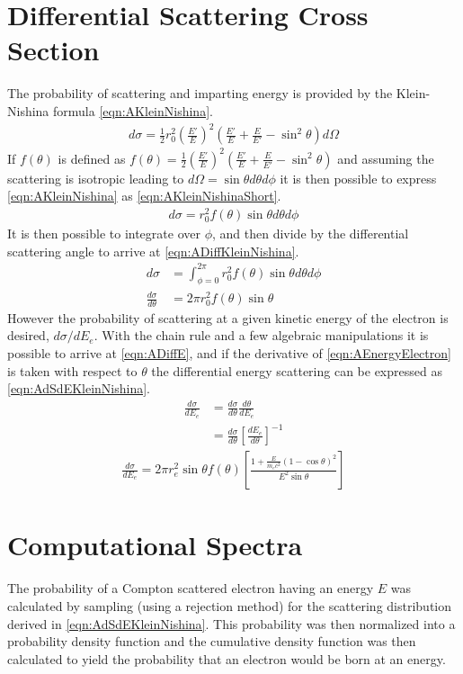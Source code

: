 \section{Differential Scattering Cross Section}
The probability of scattering and imparting energy is provided by the Klein-Nishina formula \eqref{eqn:AKleinNishina}.
\begin{align}
  \label{eqn:AKleinNishina}
  d\sigma = \frac{1}{2} r_0^2 \left(\frac{E'}{E}\right)^2 \left(\frac{E'}{E} + \frac{E}{E'}-\sin^2\theta\right)d\Omega
\end{align}
If $f(\theta)$ is defined as $f(\theta) = \frac{1}{2}\left(\frac{E'}{E}\right)^2 \left(\frac{E'}{E} + \frac{E}{E'}-\sin^2\theta\right)$ and assuming the scattering is isotropic leading to $d\Omega = \sin\theta d\theta d\phi$ it is then possible to express \eqref{eqn:AKleinNishina} as \eqref{eqn:AKleinNishinaShort}.
\begin{align}
  \label{eqn:AKleinNishinaShort}
    d\sigma = r_0^2 f(\theta)\sin\theta d\theta d\phi
\end{align}
It is then possible to integrate over $\phi$, and then divide by the differential scattering angle to arrive at \eqref{eqn:ADiffKleinNishina}.
\begin{align}
  \label{eqn:ADiffKleinNishina}
  d\sigma &=\int_{\phi=0}^{2\pi} r_0^2 f(\theta)\sin\theta d\theta d\phi\\
  \frac{d\sigma}{d\theta} &=2\pi r_0^2 f(\theta)\sin\theta
\end{align}
However the probability of scattering at a given kinetic energy of the electron is desired, $d\sigma/dE_e$.
With the chain rule and a few algebraic manipulations it is possible to arrive at \eqref{eqn:ADiffE}, and if the derivative of \eqref{eqn:AEnergyElectron} is taken with respect to $\theta$ the differential energy scattering can be expressed as \eqref{eqn:AdSdEKleinNishina}.
\begin{align}
  \label{eqn:ADiffE}
  \frac{d\sigma}{dE_e} & = \frac{d\sigma}{d\theta} \frac{d\theta}{dE_e} \\
   & = \frac{d\sigma}{d\theta} \left[\frac{dE_e}{d\theta}\right]^{-1} 
\end{align}
\begin{align}
  \label{eqn:AdSdEKleinNishina}
\frac{d\sigma}{dE_e} = 2\pi r_e^2 \sin \theta f(\theta)\left [ \frac{1+\frac{E}{m_e c^2}\left(1-\cos\theta \right)^2}{E^2 \sin \theta} \right ]
\end{align}

\section{Computational Spectra}
The probability of a Compton scattered electron having an energy $E$ was calculated by sampling (using a rejection method) for the scattering distribution derived in \autoref{eqn:AdSdEKleinNishina}.
This probability was then normalized into a probability density function and the cumulative density function was then calculated to yield the probability that an electron would be born at an energy.

